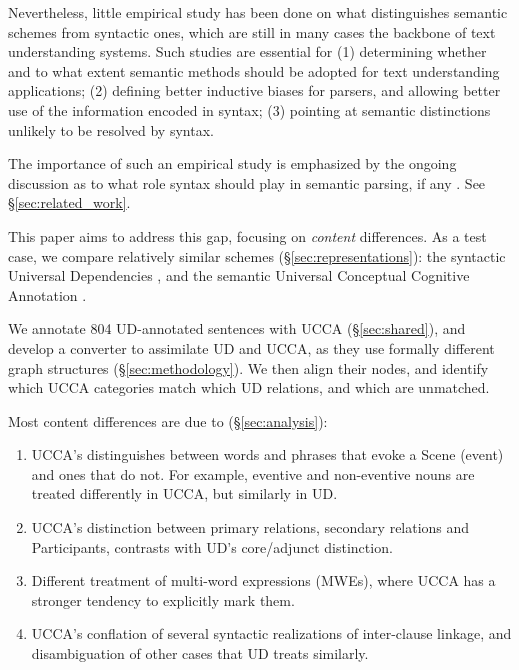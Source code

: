 \documentclass[11pt,a4paper]{article}
\begin{document}
  Nevertheless, little empirical study has been done on what distinguishes semantic schemes from
  syntactic ones, which are still in many cases the backbone of text understanding systems. 
  Such studies are essential for 
  (1) determining whether and to what extent semantic methods should be adopted for text understanding applications;
  (2) defining better inductive biases for parsers, and allowing better use of the information encoded in syntax;
  (3) pointing at semantic distinctions unlikely to be resolved by syntax.

  The importance of such an empirical study is emphasized by the ongoing discussion as to what role syntax should
  play in semantic parsing, if any \cite{swayamdipta2018syntactic,strubell2018linguistically,P18-1192,C18-1233}.
  See \S\ref{sec:related_work}.

  This paper aims to address this gap,
  focusing on {\it content} differences.
  As a test case, we compare relatively similar schemes (\S\ref{sec:representations}):
  the syntactic Universal Dependencies \cite[UD; ][]{nivre2016universal},
  and the semantic Universal Conceptual Cognitive Annotation \cite[UCCA; ][]{abend2013universal}.
  
  We annotate 804 UD-annotated sentences with UCCA (\S\ref{sec:shared}),
  and develop a converter to assimilate UD and UCCA,
  as they use formally different graph structures
  (\S\ref{sec:methodology}).
  We then align their nodes, and identify which UCCA categories match which UD relations,
  and which are unmatched.

  Most content differences are due to (\S\ref{sec:analysis}):
  \begin{enumerate}[noitemsep]%
      \item UCCA's distinguishes between words and phrases that evoke a Scene (event) and ones that do not.
        For example, eventive and non-eventive nouns are treated differently in UCCA, but similarly in UD.
      \item UCCA's distinction between primary relations, secondary relations
        and Participants, contrasts with UD's core/adjunct distinction. %
      \item Different treatment of multi-word expressions (MWEs),
        where UCCA has a stronger tendency to explicitly mark them. %
      \item UCCA's conflation of several syntactic realizations of inter-clause linkage,
        and disambiguation of other cases that UD treats similarly.
   \end{enumerate}
\end{document}
